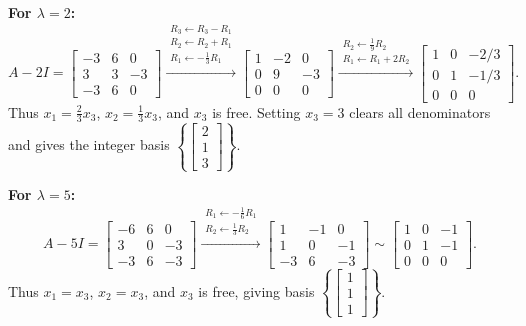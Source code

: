 \documentclass[11pt, letterpaper]{article}
\theoremstyle{definition}
\theoremstyle{remark}
\begin{document}
\textbf{For $\lambda = 2$:}
\[
A - 2I = \begin{bmatrix} -3 & 6 & 0 \\ 3 & 3 & -3 \\ -3 & 6 & 0 \end{bmatrix}
\xrightarrow{\substack{R_3 \leftarrow R_3 - R_1 \\ R_2 \leftarrow R_2 + R_1 \\ R_1 \leftarrow -\frac{1}{3}R_1}}
\begin{bmatrix} 1 & -2 & 0 \\ 0 & 9 & -3 \\ 0 & 0 & 0 \end{bmatrix}
\xrightarrow{\substack{R_2 \leftarrow \frac{1}{9}R_2 \\ R_1 \leftarrow R_1 + 2R_2}}
\begin{bmatrix} 1 & 0 & -2/3 \\ 0 & 1 & -1/3 \\ 0 & 0 & 0 \end{bmatrix}.
\]
Thus $x_1 = \frac{2}{3}x_3$, $x_2 = \frac{1}{3}x_3$, and $x_3$ is free. Setting $x_3 = 3$ clears all denominators and gives the integer basis $\left\{ \begin{bmatrix} 2 \\ 1 \\ 3 \end{bmatrix} \right\}$.

\textbf{For $\lambda = 5$:}
\[
A - 5I = \begin{bmatrix} -6 & 6 & 0 \\ 3 & 0 & -3 \\ -3 & 6 & -3 \end{bmatrix}
\xrightarrow{\substack{R_1 \leftarrow -\frac{1}{6}R_1 \\ R_2 \leftarrow \frac{1}{3}R_2}}
\begin{bmatrix} 1 & -1 & 0 \\ 1 & 0 & -1 \\ -3 & 6 & -3 \end{bmatrix}
\sim
\begin{bmatrix} 1 & 0 & -1 \\ 0 & 1 & -1 \\ 0 & 0 & 0 \end{bmatrix}.
\]
Thus $x_1 = x_3$, $x_2 = x_3$, and $x_3$ is free, giving basis $\left\{ \begin{bmatrix} 1 \\ 1 \\ 1 \end{bmatrix} \right\}$.
\end{document}
